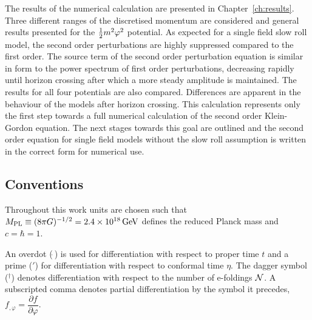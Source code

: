 The results of the numerical calculation are presented in Chapter~\ref{ch:results}.
Three different ranges of the discretised momentum are considered and general
results presented for the $\frac{1}{2} m^2 \varphi^2$ potential. 
As expected for a single field slow
roll model, the second order perturbations are highly suppressed compared to the
first order. 
The source term of the second order perturbation equation is similar in form to the
power spectrum of first order perturbations, decreasing rapidly until horizon
crossing after which a more steady amplitude is maintained.
% 
% 
The results for all four potentials are also compared. Differences are apparent in
the behaviour of the models after horizon crossing.
This calculation represents only the first step towards a full numerical calculation
of the second order Klein-Gordon equation. The next stages towards this goal are
outlined and the second order equation for single field models without the slow roll
assumption is written in the correct form for numerical use.







\subsection*{Conventions}
\label{sec:conventions}
Throughout this work units are chosen such that $M_{\mathrm{PL}} \equiv (8\pi G )^{-1/2}=
2.4 \times 10^{18}\, {\rm GeV}$ defines the reduced Planck mass and $c=\hbar =1$. 

An overdot ($\dot{~}$) is used for differentiation with respect to proper
time $t$ and a prime ($'$) for differentiation with respect to conformal time
$\eta$. The dagger symbol ($^\dagger$) denotes differentiation with respect to the
number of e-foldings $\mathcal{N}$.
% 
A subscripted comma denotes partial differentiation by the symbol it
precedes, \eg $f_{,\varphi} = \dfrac{\partial f}{\partial \varphi}$.


